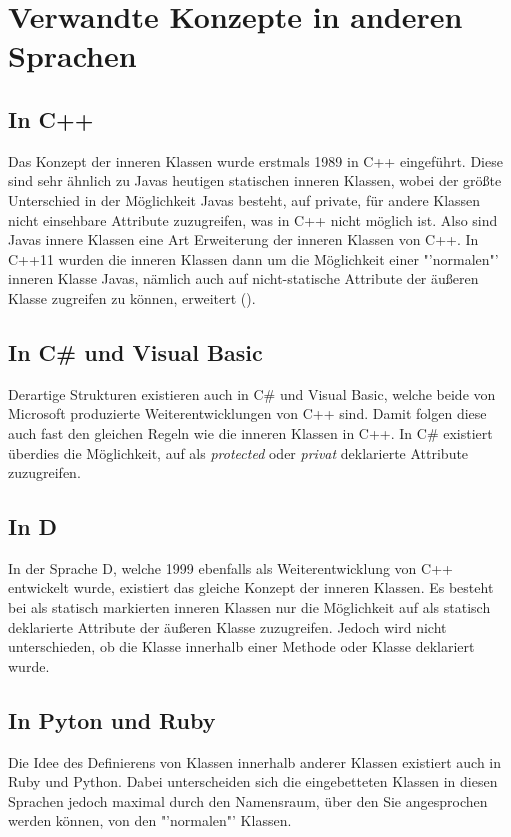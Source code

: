 \chapter{Verwandte Konzepte in anderen Sprachen}
\section{In C++}

Das Konzept der inneren Klassen wurde erstmals 1989 in C++ eingeführt.
Diese sind sehr ähnlich zu Javas heutigen statischen inneren Klassen, wobei der größte Unterschied in der Möglichkeit Javas besteht, auf private, für andere Klassen nicht einsehbare Attribute zuzugreifen, was in C++ nicht möglich ist.
Also sind Javas innere Klassen eine Art Erweiterung der inneren Klassen von C++.
In C++11 wurden die inneren Klassen dann um die Möglichkeit einer "'normalen"' inneren Klasse Javas,
 nämlich auch auf nicht-statische Attribute der äußeren Klasse zugreifen zu können, erweitert (\cite{Ellis2007}).

\section{In C\# und Visual Basic}

Derartige Strukturen existieren auch in C\# und Visual Basic, welche beide von Microsoft produzierte Weiterentwicklungen von C++ sind.
Damit folgen diese auch fast den gleichen Regeln wie die inneren Klassen in C++.
In C\# existiert überdies die Möglichkeit, auf als {\it protected} oder {\it privat} deklarierte Attribute zuzugreifen.

\section{In D}

In der Sprache D, welche 1999 ebenfalls als Weiterentwicklung von C++ entwickelt wurde, existiert das gleiche Konzept der inneren Klassen.
Es besteht bei als statisch markierten inneren Klassen nur die Möglichkeit auf als statisch deklarierte Attribute der äußeren Klasse zuzugreifen.
Jedoch wird nicht unterschieden, ob die Klasse innerhalb einer Methode oder Klasse deklariert wurde.

\section{In Pyton und Ruby}

Die Idee des Definierens von Klassen innerhalb anderer Klassen existiert auch in Ruby und Python.
Dabei unterscheiden sich die eingebetteten Klassen in diesen Sprachen jedoch maximal durch den Namensraum,
über den Sie angesprochen werden können, von den "'normalen"' Klassen.
